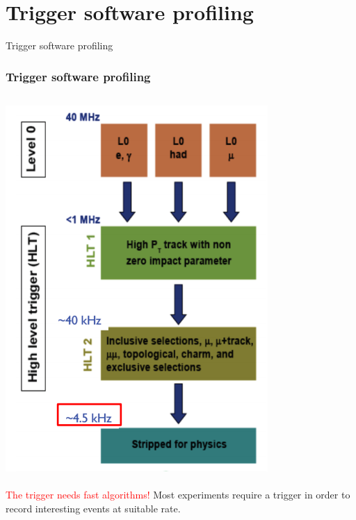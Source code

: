 \documentclass{beamer}
\begin{document}
\section{Trigger software profiling}
\begin{frame}
\begin{exampleblock}{}
  \begin{center}
    {\huge Trigger software profiling}
  \end{center}
\end{exampleblock}

\end{frame}

\begin{frame}
\frametitle{Trigger software profiling}
\begin{columns}[c]
\includegraphics[width=.9\textwidth]{images/hlt_struct1.png}\\~\\
\textcolor{red}{The trigger needs fast algorithms!}
Most experiments require a trigger in order to record interesting events at suitable rate.

\end{columns}
\end{frame}
\end{document}
